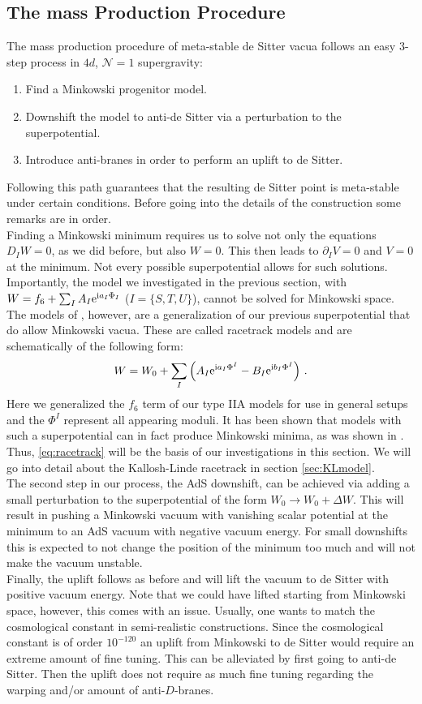 \documentclass[12pt]{report}
\newcommand{\be}{\begin{equation}}
\newcommand{\ee}{\end{equation}}
\def\rmi{{\rm i}}
\def\rme{{\rm e}}
\begin{document}
\subsection{The mass Production Procedure}
The mass production procedure of meta-stable de Sitter vacua follows an easy 3-step process in $4d$, $\mathcal{N}=1$ supergravity:
\begin{enumerate}
\item Find a Minkowski progenitor model.
\item Downshift the model to anti-de Sitter via a perturbation to the superpotential.
\item Introduce anti-branes in order to perform an uplift to de Sitter.
\end{enumerate}
Following this path guarantees that the resulting de Sitter point is meta-stable under certain conditions.
Before going into the details of the construction some remarks are in order. \\
Finding a Minkowski minimum requires us to solve not only the equations $D_I W =0$, as we did before, but also $W=0$. This then leads to $\partial_I V=0$ and $V=0$ at the minimum. Not every possible superpotential allows for such solutions. Importantly, the model we investigated in the previous section, with $W = f_6 + \sum_I A_I \rme^{\rmi a_I \Phi_I}$ ($I = \{S,T,U\}$), cannot be  solved for Minkowski space. The models of \cite{Kallosh:2004yh,BlancoPillado:2005fn,Kallosh:2011qk}, however, are a generalization of our previous superpotential that do allow Minkowski vacua. These are called racetrack models and are schematically of the following form:
\be 
W = W_0 + \sum_I \left( A_I \rme^{\rmi a_I  \Phi^I} - B_I \rme^{\rmi b_I  \Phi^I}\right)\,.
\label{eq:racetrack}
\ee
Here we generalized the $f_6$ term of our type IIA models for use in general setups and the $\Phi^I$ represent all appearing moduli. It has been shown that models with such a superpotential can in fact produce Minkowski minima, as was shown in \cite{Kallosh:2019zgd,Kallosh:2004yh}. Thus, \eqref{eq:racetrack} will be the basis of our investigations in this section. We will go into detail about the Kallosh-Linde racetrack in section \ref{sec:KLmodel}.\\
The second step in our process, the AdS downshift, can be achieved via adding a small perturbation to the superpotential of the form $W_0 \to W_0 + \Delta W$. This will result in pushing a Minkowski vacuum with vanishing scalar potential at the minimum to an AdS vacuum with negative vacuum energy. For small downshifts this is expected to not change the position of the minimum too much and will not make the vacuum unstable.\\
Finally, the uplift follows as before and will lift the vacuum to de Sitter with positive vacuum energy. Note that we could have lifted starting from Minkowski space, however, this comes with an issue. Usually, one wants to match the cosmological constant in semi-realistic constructions. Since the cosmological constant is of order $10^{-120}$ an uplift from Minkowski to de Sitter would require an extreme amount of fine tuning. This can be alleviated by first going to anti-de Sitter. Then the uplift does not require as much fine tuning regarding the warping and/or amount of anti-$D$-branes.
\end{document}
